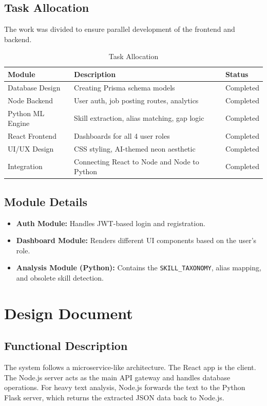\documentclass[12pt,a4paper]{report}
\begin{document}
\section{Task Allocation}
The work was divided to ensure parallel development of the frontend and backend.
\begin{table}[H]
\centering
\begin{tabular}{|l|l|l|}
\hline
\textbf{Module} & \textbf{Description} & \textbf{Status} \\
\hline
Database Design & Creating Prisma schema models & Completed \\
\hline
Node Backend & User auth, job posting routes, analytics & Completed \\
\hline
Python ML Engine & Skill extraction, alias matching, gap logic & Completed \\
\hline
React Frontend & Dashboards for all 4 user roles & Completed \\
\hline
UI/UX Design & CSS styling, AI-themed neon aesthetic & Completed \\
\hline
Integration & Connecting React to Node and Node to Python & Completed \\
\hline
\end{tabular}
\caption{Task Allocation}
\end{table}

\section{Module Details}
\begin{itemize}
    \item \textbf{Auth Module:} Handles JWT-based login and registration.
    \item \textbf{Dashboard Module:} Renders different UI components based on the user's role.
    \item \textbf{Analysis Module (Python):} Contains the \verb|SKILL_TAXONOMY|, alias mapping, and obsolete skill detection.
\end{itemize}

\chapter{Design Document}

\section{Functional Description}
The system follows a microservice-like architecture. The React app is the client. The Node.js server acts as the main API gateway and handles database operations. For heavy text analysis, Node.js forwards the text to the Python Flask server, which returns the extracted JSON data back to Node.js.
\end{document}
